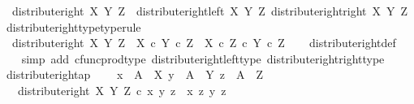 \begin{isabellebody}
\ \ {\isachardoublequoteopen}distribute{\isacharunderscore}{\kern0pt}right\ X\ Y\ Z\ {\isacharequal}{\kern0pt}\ {\isasymlangle}distribute{\isacharunderscore}{\kern0pt}right{\isacharunderscore}{\kern0pt}left\ X\ Y\ Z{\isacharcomma}{\kern0pt}\ distribute{\isacharunderscore}{\kern0pt}right{\isacharunderscore}{\kern0pt}right\ X\ Y\ Z{\isasymrangle}{\isachardoublequoteclose}\isanewline
\isanewline
{}\isamarkupfalse%
\ distribute{\isacharunderscore}{\kern0pt}right{\isacharunderscore}{\kern0pt}type{\isacharbrackleft}{\kern0pt}type{\isacharunderscore}{\kern0pt}rule{\isacharbrackright}{\kern0pt}{\isacharcolon}{\kern0pt}\isanewline
\ \ {\isachardoublequoteopen}distribute{\isacharunderscore}{\kern0pt}right\ X\ Y\ Z\ {\isacharcolon}{\kern0pt}\ {\isacharparenleft}{\kern0pt}X\ {\isasymtimes}\isactrlsub c\ Y{\isacharparenright}{\kern0pt}\ {\isasymtimes}\isactrlsub c\ Z\ {\isasymrightarrow}\ {\isacharparenleft}{\kern0pt}X\ {\isasymtimes}\isactrlsub c\ Z{\isacharparenright}{\kern0pt}\ {\isasymtimes}\isactrlsub c\ {\isacharparenleft}{\kern0pt}Y\ {\isasymtimes}\isactrlsub c\ Z{\isacharparenright}{\kern0pt}{\isachardoublequoteclose}\isanewline
%
\isadelimproof
\ \ %
\endisadelimproof
%
\isatagproof
{}\isamarkupfalse%
\ distribute{\isacharunderscore}{\kern0pt}right{\isacharunderscore}{\kern0pt}def\isanewline
\ \ \isamarkupfalse%
\ {\isacharparenleft}{\kern0pt}simp\ add{\isacharcolon}{\kern0pt}\ cfunc{\isacharunderscore}{\kern0pt}prod{\isacharunderscore}{\kern0pt}type\ distribute{\isacharunderscore}{\kern0pt}right{\isacharunderscore}{\kern0pt}left{\isacharunderscore}{\kern0pt}type\ distribute{\isacharunderscore}{\kern0pt}right{\isacharunderscore}{\kern0pt}right{\isacharunderscore}{\kern0pt}type{\isacharparenright}{\kern0pt}%
\endisatagproof
{\isafoldproof}%
%
\isadelimproof
\isanewline
%
\endisadelimproof
\isanewline
{}\isamarkupfalse%
\ distribute{\isacharunderscore}{\kern0pt}right{\isacharunderscore}{\kern0pt}ap{\isacharcolon}{\kern0pt}\ \isanewline
\ \ \ {\isachardoublequoteopen}x\ {\isacharcolon}{\kern0pt}\ A\ {\isasymrightarrow}\ X{\isachardoublequoteclose}\ {\isachardoublequoteopen}y\ {\isacharcolon}{\kern0pt}\ A\ {\isasymrightarrow}\ Y{\isachardoublequoteclose}\ {\isachardoublequoteopen}z\ {\isacharcolon}{\kern0pt}\ A\ {\isasymrightarrow}\ Z{\isachardoublequoteclose}\isanewline
\ \ \ {\isachardoublequoteopen}distribute{\isacharunderscore}{\kern0pt}right\ X\ Y\ Z\ {\isasymcirc}\isactrlsub c\ {\isasymlangle}{\isasymlangle}x{\isacharcomma}{\kern0pt}\ y{\isasymrangle}{\isacharcomma}{\kern0pt}\ z{\isasymrangle}\ {\isacharequal}{\kern0pt}\ {\isasymlangle}{\isasymlangle}x{\isacharcomma}{\kern0pt}\ z{\isasymrangle}{\isacharcomma}{\kern0pt}\ {\isasymlangle}y{\isacharcomma}{\kern0pt}\ z{\isasymrangle}{\isasymrangle}{\isachardoublequoteclose}\isanewline

\end{isabellebody}
